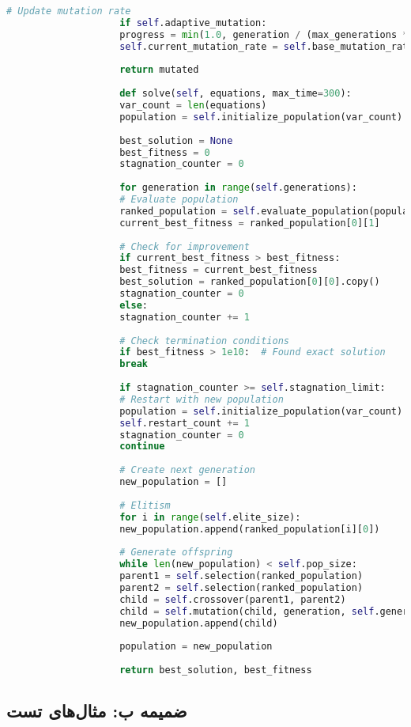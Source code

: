 \documentclass[12pt,a4paper]{article}
\newenvironment{ltrcode}{\lr\bgroup}{\egroup}
\begin{document}
\begin{ltrcode}
\begin{lstlisting}[language=Python, caption=کلاس کامل EnhancedGeneticEquationSolver]
					# Update mutation rate
					if self.adaptive_mutation:
					progress = min(1.0, generation / (max_generations * 0.7))
					self.current_mutation_rate = self.base_mutation_rate * (1.0 - 0.6 * progress)
					
					return mutated
					
					def solve(self, equations, max_time=300):
					var_count = len(equations)
					population = self.initialize_population(var_count)
					
					best_solution = None
					best_fitness = 0
					stagnation_counter = 0
					
					for generation in range(self.generations):
					# Evaluate population
					ranked_population = self.evaluate_population(population, equations)
					current_best_fitness = ranked_population[0][1]
					
					# Check for improvement
					if current_best_fitness > best_fitness:
					best_fitness = current_best_fitness
					best_solution = ranked_population[0][0].copy()
					stagnation_counter = 0
					else:
					stagnation_counter += 1
					
					# Check termination conditions
					if best_fitness > 1e10:  # Found exact solution
					break
					
					if stagnation_counter >= self.stagnation_limit:
					# Restart with new population
					population = self.initialize_population(var_count)
					self.restart_count += 1
					stagnation_counter = 0
					continue
					
					# Create next generation
					new_population = []
					
					# Elitism
					for i in range(self.elite_size):
					new_population.append(ranked_population[i][0])
					
					# Generate offspring
					while len(new_population) < self.pop_size:
					parent1 = self.selection(ranked_population)
					parent2 = self.selection(ranked_population)
					child = self.crossover(parent1, parent2)
					child = self.mutation(child, generation, self.generations)
					new_population.append(child)
					
					population = new_population
					
					return best_solution, best_fitness
				\end{lstlisting}
			\end{ltrcode}
			
			\subsection{ضمیمه ب: مثال‌های تست}
			
\end{document}
